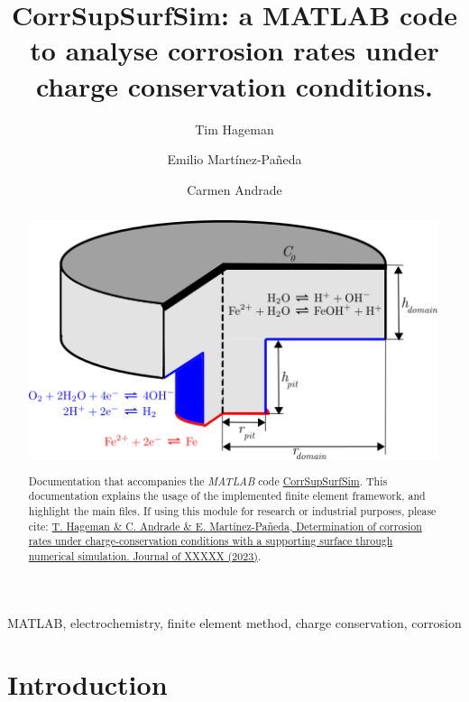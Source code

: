 \documentclass[3p]{elsarticle} %
\let\oldtodo\todo
\renewcommand{\todo}[1]{\oldtodo[inline]{#1}}
\newcommand{\citeMe}{\href{DOI HERE}{T. Hageman \& C. Andrade \& E. Martínez-Pañeda, Determination of corrosion rates under charge-conservation conditions with a supporting surface through numerical simulation. Journal of XXXXX (2023)}}
\begin{document}
\begin{frontmatter}
\title{Corr\textunderscore Sup\textunderscore Surf\textunderscore Sim: a MATLAB code to analyse corrosion rates under charge conservation conditions.}

\author[1]{Tim Hageman }
\author[1]{Emilio Martínez-Pañeda}
\author[2]{Carmen Andrade}

\address[1]{Department of Civil and Environmental Engineering, Imperial College London, London SW7 2AZ, UK}
\address[2]{International Center of Numerical Methods in Engineering (CIMNE), Madrid 28010, Spain}

\begin{abstract}
\begin{center}
\includegraphics[width=12cm]{../Figures/Domain.png}
\end{center}
Documentation that accompanies the \textit{MATLAB} code \href{https://github.com/T-Hageman/Corr_Sup_Surf_Sim}{Corr\textunderscore Sup\textunderscore Surf\textunderscore Sim}. This documentation explains the usage of the implemented finite element framework, and highlight the main files. If using this module for research or industrial purposes, please cite: \citeMe{}.
\end{abstract}

\begin{keyword}
MATLAB, electrochemistry, finite element method, charge conservation, corrosion
\end{keyword}

\end{frontmatter}

\tableofcontents

\section{Introduction}
\todo{Intro}
\end{document}
